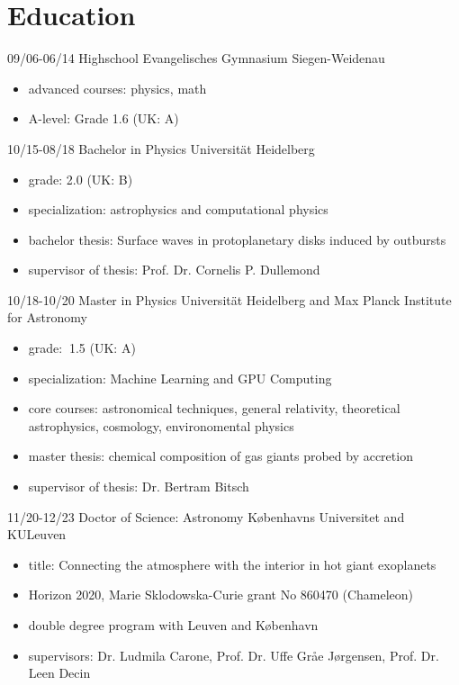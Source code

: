 \documentclass[]{friggeri-cv}
\begin{document}
\section{Education}
\begin{entrylist}
  \entry
    {09/06-06/14}
    {Highschool}
    {Evangelisches Gymnasium Siegen-Weidenau}
    {\begin{itemize}\vspace{-3mm}
		\item advanced courses: physics, math
		\item A-level: Grade 1.6 (UK: A)
	\end{itemize}}
  \entry
    {10/15-08/18}
    {Bachelor in Physics}
    {Universität Heidelberg}
    {\begin{itemize}\vspace{-3mm}
    	\item grade: 2.0 (UK: B)
    	\item specialization: astrophysics and computational physics
    	\item bachelor thesis: Surface waves in protoplanetary disks induced by outbursts
    	\item supervisor of thesis: Prof. Dr. Cornelis P. Dullemond
    \end{itemize}
	}
  \entry
    {10/18-10/20}
    {Master in Physics}
    {Universität Heidelberg and Max Planck Institute for Astronomy}
    {\begin{itemize}\vspace{-3mm}
    	\item grade: $~$1.5 (UK: A)
    	\item specialization: Machine Learning and GPU Computing
    	\item core courses: astronomical techniques, general relativity, theoretical astrophysics, cosmology, environomental physics
    	\item master thesis: chemical composition of gas giants probed by accretion
    	\item supervisor of thesis: Dr. Bertram Bitsch
    \end{itemize}
    }
  \entry    
    {11/20-12/23}
    {Doctor of Science: Astronomy}
    {K{\o}benhavns Universitet and KULeuven}
    {\begin{itemize}\vspace{-3mm}
    \item title: Connecting the atmosphere with the interior in hot giant exoplanets
    \item Horizon 2020, Marie Sklodowska-Curie grant No 860470 (Chameleon)
    \item double degree program with Leuven and København
    \item supervisors: Dr. Ludmila Carone, Prof. Dr. Uffe Gråe Jørgensen, Prof. Dr. Leen Decin
    \end{itemize}    
	}
	\\
\end{entrylist}
\end{document}
